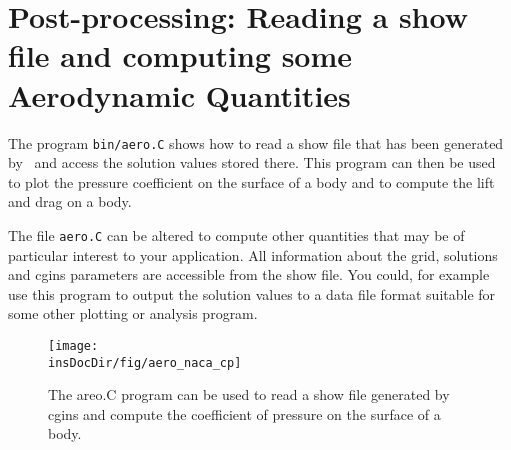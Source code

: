 \section{Post-processing: Reading a show file and computing some Aerodynamic Quantities}

The program {\tt bin/aero.C} shows how to read a show file that has been
generated by \solver\ and access the solution values stored there. This program
can then be used to plot the pressure coefficient on the surface of a body
and to compute the lift and drag on a body. 

The file {\tt aero.C} can be altered to compute other quantities that may
be of particular interest to your application. All information about the grid,
solutions and cgins parameters are accessible from the show file. You could, for example
use this program to output the solution values to a data file format suitable for some
other plotting or analysis program.

\begin{figure}[hb]
\begin{center}
  \texttt{[image: \\insDocDir/fig/aero\_naca\_cp]}
 \caption{The areo.C program can be used to read a show file generated by cgins and compute
the coefficient of pressure on the surface of a body.}
\end{center}
\end{figure}

